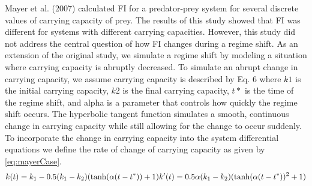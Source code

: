 \documentclass[12pt,twoside,openany]{reedthesis}
\begin{document}
Mayer et al. (2007) calculated FI for a predator-prey system for several
discrete values of carrying capacity of prey. The results of this study
showed that FI was different for systems with different carrying
capacities. However, this study did not address the central question of
how FI changes during a regime shift. As an extension of the original
study, we simulate a regime shift by modeling a situation where carrying
capacity is abruptly decreased. To simulate an abrupt change in carrying
capacity, we assume carrying capacity is described by Eq. 6 where \(k1\)
is the initial carrying capacity, \(k2\) is the final carrying capacity,
\(t*\) is the time of the regime shift, and alpha is a parameter that
controls how quickly the regime shift occurs. The hyperbolic tangent
function simulates a smooth, continuous change in carrying capacity
while still allowing for the change to occur suddenly. To incorporate
the change in carrying capacity into the system differential equations
we define the rate of change of carrying capacity as given by
\eqref{eq:mayerCase}.\\
\begin{equation}  
  k(t) = k_1  - 0.5(k_1-k_2)(\tanh(\alpha (t-t^*))+1)     \\
  k'(t) = 0.5\alpha (k_1-k_2)(\tanh(\alpha(t-t^*))^2 +1)      \\ 
\label{eq:mayerCase}
\end{equation}
\end{document}
